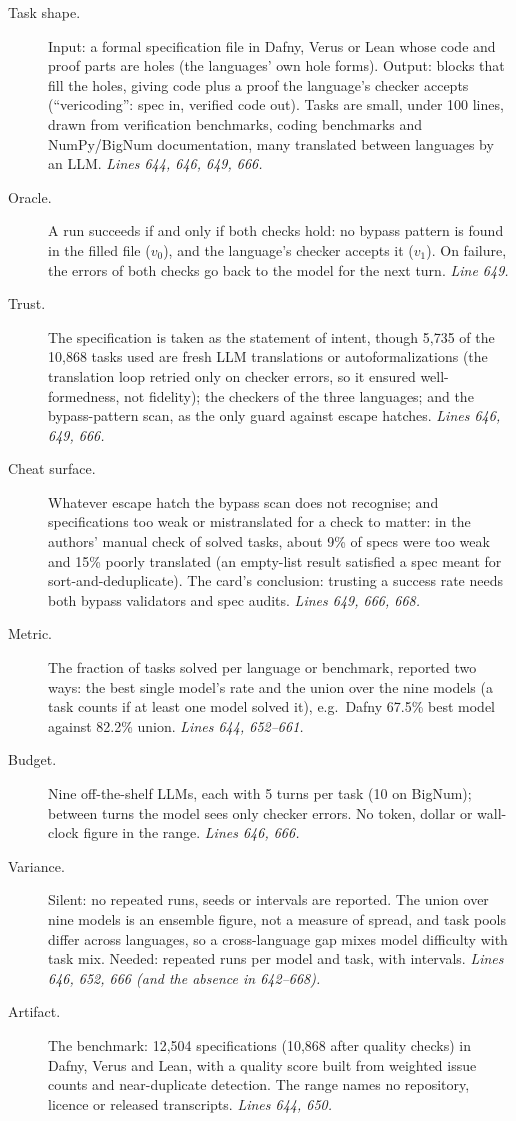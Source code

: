 \documentclass[11pt]{article}
\begin{document}
\begin{description}
\item[Task shape.] Input: a formal specification file in Dafny, Verus or
  Lean whose code and proof parts are holes (the languages' own hole forms).
  Output: blocks that fill the holes, giving code plus a proof the language's
  checker accepts (``vericoding'': spec in, verified code out). Tasks are
  small, under 100 lines, drawn from verification benchmarks, coding
  benchmarks and NumPy/BigNum documentation, many translated between languages
  by an LLM. \emph{Lines 644, 646, 649, 666.}
\item[Oracle.] A run succeeds if and only if both checks hold: no bypass
  pattern is found in the filled file ($v_0$), and the language's checker
  accepts it ($v_1$). On failure, the errors of both checks go back to the
  model for the next turn. \emph{Line 649.}
\item[Trust.] The specification is taken as the statement of intent, though
  5,735 of the 10,868 tasks used are fresh LLM translations or
  autoformalizations (the translation loop retried only on checker errors, so
  it ensured well-formedness, not fidelity); the checkers of the three
  languages; and the bypass-pattern scan, as the only guard against escape
  hatches. \emph{Lines 646, 649, 666.}
\item[Cheat surface.] Whatever escape hatch the bypass scan does not
  recognise; and specifications too weak or mistranslated for a check to
  matter: in the authors' manual check of solved tasks, about 9\% of specs
  were too weak and 15\% poorly translated (an empty-list result satisfied a
  spec meant for sort-and-deduplicate). The card's conclusion: trusting a
  success rate needs both bypass validators and spec audits.
  \emph{Lines 649, 666, 668.}
\item[Metric.] The fraction of tasks solved per language or benchmark,
  reported two ways: the best single model's rate and the union over the nine
  models (a task counts if at least one model solved it), e.g.\ Dafny 67.5\%
  best model against 82.2\% union. \emph{Lines 644, 652--661.}
\item[Budget.] Nine off-the-shelf LLMs, each with 5 turns per task (10 on
  BigNum); between turns the model sees only checker errors. No token, dollar
  or wall-clock figure in the range. \emph{Lines 646, 666.}
\item[Variance.] Silent: no repeated runs, seeds or intervals are reported.
  The union over nine models is an ensemble figure, not a measure of spread,
  and task pools differ across languages, so a cross-language gap mixes model
  difficulty with task mix. Needed: repeated runs per model and task, with
  intervals. \emph{Lines 646, 652, 666 (and the absence in 642--668).}
\item[Artifact.] The benchmark: 12,504 specifications (10,868 after quality
  checks) in Dafny, Verus and Lean, with a quality score built from weighted
  issue counts and near-duplicate detection. The range names no repository,
  licence or released transcripts. \emph{Lines 644, 650.}
\end{description}
\end{document}
